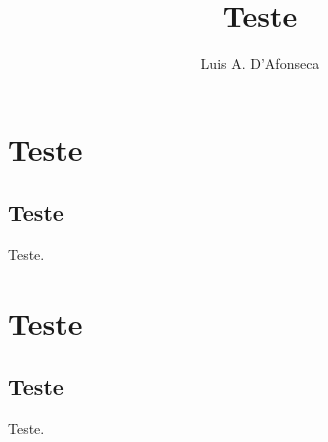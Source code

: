 \documentclass[cc=by-nc-sa]{nice-booklet}
\title{Teste}
\author{Luis A. D'Afonseca}
\begin{document}
\frontmatter

\tableofcontents


\mainmatter
\chapter{Teste}
\section{Teste}
Teste.

\appendix
\chapter{Teste}
\section{Teste}
Teste.

\end{document}

